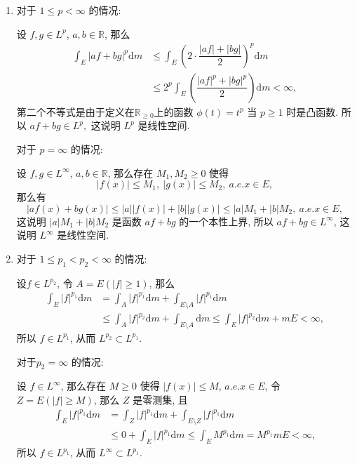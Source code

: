 \begin{solution}
  \begin{enumerate}
    \item 对于 \(1 \leqslant p < \infty\) 的情况: 

    设 \(f, g \in L^p\), \(a, b \in \mathbb{R}\), 那么
    \[\begin{aligned}
    \int_E \lvert af + bg \rvert^p \mathrm{d} m & \leqslant \int_E \left( 2 \cdot \dfrac{\lvert af \rvert + \lvert bg \rvert}{2} \right)^p \mathrm{d} m \\
    & \leqslant 2^p \int_E \left( \dfrac{\lvert af \rvert^p + \lvert bg \rvert^p}{2} \right) \mathrm{d} m < \infty,
    \end{aligned}\]
    第二个不等式是由于定义在\(\mathbb{R}_{\geqslant 0}\)上的函数 \(\phi(t) = t^p\) 当 \(p \geqslant 1\) 时是凸函数. 所以 \(af + bg \in L^p,\) 这说明 \(L^p\) 是线性空间.

    对于 \(p = \infty\) 的情况: 

    设 \(f, g \in L^\infty\), \(a, b \in \mathbb{R}\), 那么存在 \(M_1, M_2 \geqslant 0\) 使得
    \[\lvert f(x) \rvert \leqslant M_1, ~ \lvert g(x) \rvert \leqslant M_2, ~ a.e. x \in E,\]
    那么有
    \[\lvert af(x) + bg(x) \rvert \leqslant \lvert a \rvert \lvert f(x) \rvert + \lvert b \rvert \lvert g(x) \rvert \leqslant \lvert a \rvert M_1 + \lvert b \rvert M_2, ~ a.e. x \in E,\]
    这说明 \(\lvert a \rvert M_1 + \lvert b \rvert M_2\) 是函数 \(af + bg\) 的一个本性上界, 所以 \(af + bg \in L^\infty\), 这说明 \(L^\infty\) 是线性空间.
    \item 对于 \(1 \leqslant p_1 < p_2 < \infty\) 的情况: 

    设\(f \in L^{p_2}\), 令 \(A = E(\lvert f \rvert \geqslant 1)\), 那么
    \[\begin{aligned}
    \int_E \lvert f \rvert^{p_1} \mathrm{d} m & = \int_A \lvert f \rvert^{p_1} \mathrm{d} m + \int_{E \setminus A} \lvert f \rvert^{p_1} \mathrm{d} m \\
    & \leqslant \int_A \lvert f \rvert^{p_2} \mathrm{d} m + \int_{E \setminus A} \mathrm{d} m \leqslant \int_E \lvert f \rvert^{p_2} \mathrm{d} m + m E < \infty,
    \end{aligned}\]
    所以 \(f \in L^{p_1}\), 从而 \(L^{p_2} \subset L^{p_1}\).

    对于\(p_2 = \infty\) 的情况: 

    设 \(f \in L^\infty\), 那么存在 \(M \geqslant 0\) 使得 \(\lvert f(x) \rvert \leqslant M\), \(a.e. x \in E\), 令 \(Z = E(\lvert f \rvert \geqslant M)\), 那么 \(Z\) 是零测集, 且
    \[\begin{aligned}
    \int_E \lvert f \rvert^{p_1} \mathrm{d} m & = \int_Z \lvert f \rvert^{p_1} \mathrm{d} m + \int_{E \setminus Z} \lvert f \rvert^{p_1} \mathrm{d} m \\
    & \leqslant 0 + \int_E \lvert f \rvert^{p_1} \mathrm{d} m \leqslant \int_E M^{p_1} \mathrm{d} m = M^{p_1} m E < \infty,
    \end{aligned}\]
    所以 \(f \in L^{p_1}\), 从而 \(L^\infty \subset L^{p_1}\).
  \end{enumerate}
\end{solution}

